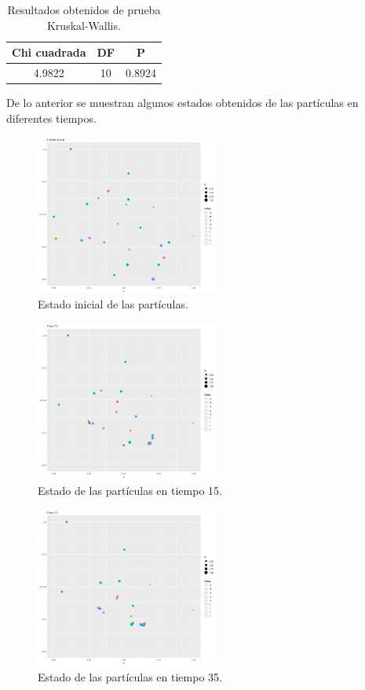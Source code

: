 \documentclass{article}
\begin{document}
\begin{table}[ht]
    \centering
    \caption{Resultados obtenidos de prueba Kruskal-Wallis.} 
    \begin{tabular}{|c|c|c|}
    \hline
    Chi cuadrada & DF & P  \\
    \hline
    4.9822 & 10 & 0.8924 \\
    \hline
\end{tabular}
    \label{cuadro 4}
\end{table}
\newpage


De lo anterior se muestran algunos estados obtenidos de las part\'iculas en diferentes tiempos.
\begin{figure}[h!] %
    \centering
    \includegraphics[width=60mm]{p9_t000.png} %
    \caption{Estado inicial de las part\'iculas.}
    \label{Figura 3}
\end{figure}
\begin{figure}[h!] %
    \centering
    \includegraphics[width=60mm]{p9_t015.png} %
    \caption{Estado de las part\'iculas en tiempo 15.}
    \label{Figura 4}
\end{figure}
\begin{figure}[h!] %
    \centering
    \includegraphics[width=60mm]{p9_t035.png} %
    \caption{Estado de las part\'iculas en tiempo 35.}
    \label{Figura 5}
\end{figure}
\end{document}
